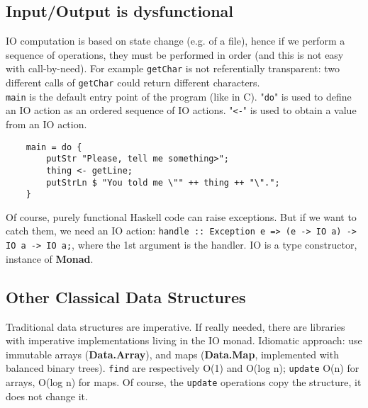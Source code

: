 \subsection{Input/Output is dysfunctional}
IO computation is based on state change (e.g. of a file), hence if we perform a sequence of operations, they must be performed in order (and this is not easy with call-by-need).
For example \texttt{getChar} is not referentially transparent: two different calls of \texttt{getChar} could return different characters.\\
\texttt{main} is the default entry point of the program (like in C).
"\texttt{do}" is used to define an IO action as an ordered sequence of IO actions.
"\texttt{<-}" is used to obtain a value from an IO action.
\begin{lstlisting}
	main = do {
		putStr "Please, tell me something>";
		thing <- getLine;
		putStrLn $ "You told me \"" ++ thing ++ "\".";
	}
\end{lstlisting}
Of course, purely functional Haskell code can raise exceptions.
But if we want to catch them, we need an IO action: \texttt{handle :: Exception e => (e -> IO a) -> IO a -> IO a;}, where the 1st argument is the handler.
IO is a type constructor, instance of \textbf{Monad}.

\subsection{Other Classical Data Structures}
Traditional data structures are imperative.
If really needed, there are libraries with imperative implementations living in the IO monad.
Idiomatic approach: use immutable arrays (\textbf{Data.Array}), and maps (\textbf{Data.Map}, implemented with balanced binary trees).
\texttt{find} are respectively O(1) and O(log n); \texttt{update} O(n) for arrays, O(log n) for maps.
Of course, the \texttt{update} operations copy the structure, it does not change it.

